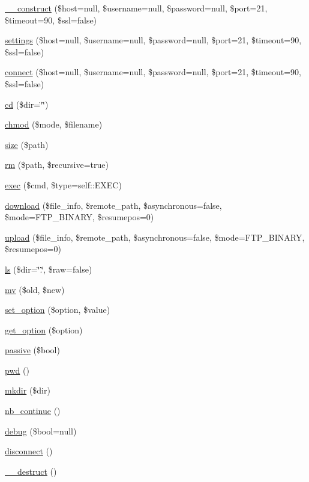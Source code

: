 \begin{DoxyCompactItemize}
\item 
\hyperlink{class_f_t_p_client_a7b039c120cfd23322f2853d9218f9e5b}{\_\-\_\-construct} (\$host=null, \$username=null, \$password=null, \$port=21, \$timeout=90, \$ssl=false)
\item 
\hyperlink{class_f_t_p_client_ada0765ad7f447a800abb350143f56663}{settings} (\$host=null, \$username=null, \$password=null, \$port=21, \$timeout=90, \$ssl=false)
\item 
\hyperlink{class_f_t_p_client_a25029a4eb4d4323e219419cc1d69029a}{connect} (\$host=null, \$username=null, \$password=null, \$port=21, \$timeout=90, \$ssl=false)
\item 
\hyperlink{class_f_t_p_client_a619b11b2b96625def5ac30e28236e784}{cd} (\$dir=\char`\"{}\char`\"{})
\item 
\hyperlink{class_f_t_p_client_aa4f501a61b8c6660f5cd9ab7fbbddc05}{chmod} (\$mode, \$filename)
\item 
\hyperlink{class_f_t_p_client_ab81b2fcdcce182104aa8f835eb6aa836}{size} (\$path)
\item 
\hyperlink{class_f_t_p_client_a3781b6798de8723f69a7100c025eb38e}{rm} (\$path, \$recursive=true)
\item 
\hyperlink{class_f_t_p_client_a3b72c7c069843a8b41663af2a26988d6}{exec} (\$cmd, \$type=self::EXEC)
\item 
\hyperlink{class_f_t_p_client_ab9b72253b2bae412688b82c2cafbc388}{download} (\$file\_\-info, \$remote\_\-path, \$asynchronous=false, \$mode=FTP\_\-BINARY, \$resumepos=0)
\item 
\hyperlink{class_f_t_p_client_a76949113e1b51cabad6a4b6e8e1012fa}{upload} (\$file\_\-info, \$remote\_\-path, \$asynchronous=false, \$mode=FTP\_\-BINARY, \$resumepos=0)
\item 
\hyperlink{class_f_t_p_client_a9569596e11e5eef366d04f377841ebe6}{ls} (\$dir=\char`\"{}.\char`\"{}, \$raw=false)
\item 
\hyperlink{class_f_t_p_client_a628c099e44c71266ac750ac9991d7ee1}{mv} (\$old, \$new)
\item 
\hyperlink{class_f_t_p_client_a0669c4833b879d8f4b7d0f47afe6407e}{set\_\-option} (\$option, \$value)
\item 
\hyperlink{class_f_t_p_client_ad1e77e1e084da710f1f28626173c94c0}{get\_\-option} (\$option)
\item 
\hyperlink{class_f_t_p_client_abf14e152165c50abe01c69633a676d58}{passive} (\$bool)
\item 
\hyperlink{class_f_t_p_client_a1511823794ead286997c53a7825d3b98}{pwd} ()
\item 
\hyperlink{class_f_t_p_client_a955a12491968dd12e288385ceddbed71}{mkdir} (\$dir)
\item 
\hyperlink{class_f_t_p_client_aec70350d58be4e57731fc2d4c29b1505}{nb\_\-continue} ()
\item 
\hyperlink{class_f_t_p_client_a2a03052ba2317d6c4b96ddd9bb4537c3}{debug} (\$bool=null)
\item 
\hyperlink{class_f_t_p_client_abe175fcf658475bc56e9d6fa02bc88ec}{disconnect} ()
\item 
\hyperlink{class_f_t_p_client_a421831a265621325e1fdd19aace0c758}{\_\-\_\-destruct} ()
\end{DoxyCompactItemize}
